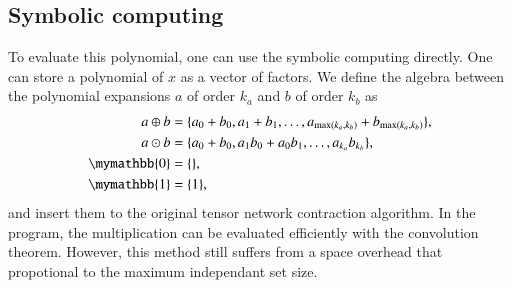 \documentclass{article}
\newcommand{\<}{\langle}
\renewcommand{\>}{\rangle}
\theoremstyle{definition}\newtheorem{definition}{\textit{Definition}}
\begin{document}
\subsection{Symbolic computing}
To evaluate this polynomial, one can use the symbolic computing directly.
One can store a polynomial of $x$ as a vector of factors.
We define the algebra between the polynomial expansions $a$ of order $k_a$ and $b$ of order $k_b$ as
\begin{align}
    \begin{split}
    a \oplus b &= \{a_0 + b_0, a_1 + b_1, \ldots, a_{\max(k_a, k_b)} + b_{\max(k_a, k_b)}\},\\
    a \odot b &= \{a_0 + b_0, a_1b_0 + a_0b_1, \ldots, a_{k_a} b_{k_b}\},\\
    \mymathbb{0} &= \{\},\\
    \mymathbb{1} &= \{1\},
    \end{split}
\end{align}
and insert them to the original tensor network contraction algorithm.
In the program, the multiplication can be evaluated efficiently with the convolution theorem.
However, this method still suffers from a space overhead that propotional to the maximum independant set size.
\end{document}
